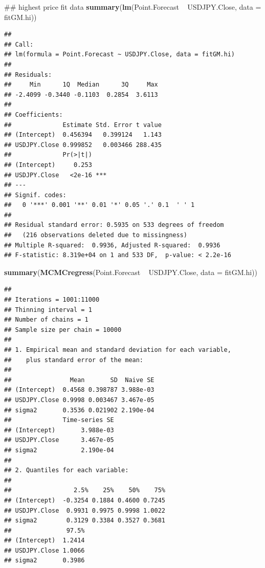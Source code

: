 \documentclass[]{tufte-book}
\newenvironment{Shaded}{}{}
\newcommand{\KeywordTok}[1]{\textcolor[rgb]{0.00,0.44,0.13}{\textbf{#1}}}
\newcommand{\DataTypeTok}[1]{\textcolor[rgb]{0.56,0.13,0.00}{#1}}
\newcommand{\StringTok}[1]{\textcolor[rgb]{0.25,0.44,0.63}{#1}}
\newcommand{\OperatorTok}[1]{\textcolor[rgb]{0.40,0.40,0.40}{#1}}
\newcommand{\NormalTok}[1]{#1}
\begin{document}
\begin{Shaded}
\begin{Highlighting}[]
\NormalTok{## highest price fit data}
\KeywordTok{summary}\NormalTok{(}\KeywordTok{lm}\NormalTok{(Point.Forecast }\OperatorTok{~}\StringTok{ }\NormalTok{USDJPY.Close, }\DataTypeTok{data =}\NormalTok{ fitGM.hi))}
\end{Highlighting}
\end{Shaded}

\begin{verbatim}
## 
## Call:
## lm(formula = Point.Forecast ~ USDJPY.Close, data = fitGM.hi)
## 
## Residuals:
##     Min      1Q  Median      3Q     Max 
## -2.4099 -0.3440 -0.1103  0.2854  3.6113 
## 
## Coefficients:
##              Estimate Std. Error t value
## (Intercept)  0.456394   0.399124   1.143
## USDJPY.Close 0.999852   0.003466 288.435
##              Pr(>|t|)    
## (Intercept)     0.253    
## USDJPY.Close   <2e-16 ***
## ---
## Signif. codes:  
##   0 '***' 0.001 '**' 0.01 '*' 0.05 '.' 0.1  ' ' 1
## 
## Residual standard error: 0.5935 on 533 degrees of freedom
##   (216 observations deleted due to missingness)
## Multiple R-squared:  0.9936, Adjusted R-squared:  0.9936 
## F-statistic: 8.319e+04 on 1 and 533 DF,  p-value: < 2.2e-16
\end{verbatim}

\begin{Shaded}
\begin{Highlighting}[]
\KeywordTok{summary}\NormalTok{(}\KeywordTok{MCMCregress}\NormalTok{(Point.Forecast }\OperatorTok{~}\StringTok{ }\NormalTok{USDJPY.Close, }
    \DataTypeTok{data =}\NormalTok{ fitGM.hi))}
\end{Highlighting}
\end{Shaded}

\begin{verbatim}
## 
## Iterations = 1001:11000
## Thinning interval = 1 
## Number of chains = 1 
## Sample size per chain = 10000 
## 
## 1. Empirical mean and standard deviation for each variable,
##    plus standard error of the mean:
## 
##                Mean       SD  Naive SE
## (Intercept)  0.4568 0.398787 3.988e-03
## USDJPY.Close 0.9998 0.003467 3.467e-05
## sigma2       0.3536 0.021902 2.190e-04
##              Time-series SE
## (Intercept)       3.988e-03
## USDJPY.Close      3.467e-05
## sigma2            2.190e-04
## 
## 2. Quantiles for each variable:
## 
##                 2.5%    25%    50%    75%
## (Intercept)  -0.3254 0.1884 0.4600 0.7245
## USDJPY.Close  0.9931 0.9975 0.9998 1.0022
## sigma2        0.3129 0.3384 0.3527 0.3681
##               97.5%
## (Intercept)  1.2414
## USDJPY.Close 1.0066
## sigma2       0.3986
\end{verbatim}
\end{document}
